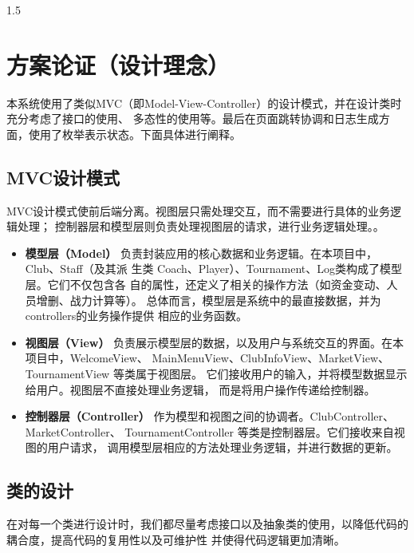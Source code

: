 \documentclass[a4paper]{article}
\begin{document}
\begin{spacing}{1.5}
    \section{方案论证（设计理念）}
        本系统使用了类似MVC（即Model-View-Controller）的设计模式，并在设计类时充分考虑了接口的使用、
        多态性的使用等。最后在页面跳转协调和日志生成方面，使用了枚举表示状态。下面具体进行阐释。
        \subsection{MVC设计模式}
            MVC设计模式使前后端分离。视图层只需处理交互，而不需要进行具体的业务逻辑处理；
            控制器层和模型层则负责处理视图层的请求，进行业务逻辑处理。。
            \begin{itemize}
                \item{\bf{模型层（Model）}}
                            负责封装应用的核心数据和业务逻辑。在本项目中，Club、Staff（及其派
                            生类 Coach、Player）、Tournament、Log类构成了模型层。它们不仅包含各
                            自的属性，还定义了相关的操作方法（如资金变动、人员增删、战力计算等）。
                            总体而言，模型层是系统中的最直接数据，并为controllers的业务操作提供
                            相应的业务函数。
                \item{\bf{视图层（View）}}
                            负责展示模型层的数据，以及用户与系统交互的界面。在本项目中，WelcomeView、
                            MainMenuView、ClubInfoView、MarketView、TournamentView 等类属于视图层。
                            它们接收用户的输入，并将模型数据显示给用户。视图层不直接处理业务逻辑，
                            而是将用户操作传递给控制器。
                \item{\bf{控制器层（Controller）}}
                            作为模型和视图之间的协调者。ClubController、MarketController、
                            TournamentController 等类是控制器层。它们接收来自视图的用户请求，
                            调用模型层相应的方法处理业务逻辑，并进行数据的更新。
            \end{itemize} 

        \subsection{类的设计}
            在对每一个类进行设计时，我们都尽量考虑接口以及抽象类的使用，以降低代码的耦合度，提高代码的复用性以及可维护性
            并使得代码逻辑更加清晰。


\end{spacing}
\end{document}
